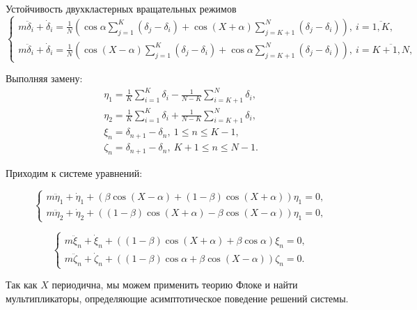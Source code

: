 \begin{chapter}{Устойчивость двухкластерных вращательных режимов}
	\begin{equation}
		\begin{cases}
			m\ddot{\delta}_i + \dot{\delta}_i = \frac{1}{N} \left( \cos{\alpha} \sum_{j = 1}^K (\delta_j - \delta_i) + \cos{(X + \alpha)} \sum_{j = K + 1}^N (\delta_j - \delta_i) \right), \ i = \overline{1,K}, \\
			m\ddot{\delta}_i + \dot{\delta}_i = \frac{1}{N} \left( \cos{(X - \alpha)} \sum_{j = 1}^K (\delta_j - \delta_i) +  \cos{\alpha} \sum_{j = K + 1}^N (\delta_j - \delta_i)  \right), \ i = \overline{K + 1,N},
		\end{cases}		
	\end{equation}
	
	Выполняя замену:
	\begin{align*}
		\eta_1 = \frac{1}{K} \sum_{i = 1}^K \delta_i - \frac{1}{N - K} \sum_{i = K + 1}^N \delta_i, \\
		\eta_2 = \frac{1}{K} \sum_{i = 1}^K \delta_i + \frac{1}{N - K} \sum_{i = K + 1}^N \delta_i, \\
		\xi_n = \delta_{n+1} - \delta_n, \ 1 \leq  n \leq K - 1, \\
		\zeta_n = \delta_{n+1} - \delta_n, \ K + 1 \leq n \leq N - 1.
	\end{align*}
		
	Приходим к системе уравнений:
	
	\begin{equation} \label{split-linear-pert-sys-n12}
		\begin{cases}
			m\ddot{\eta}_1 + \dot{\eta}_1 + \left( \beta \cos{(X - \alpha)} + (1 - \beta) \cos{(X + \alpha)} \right) \eta_1 = 0, \\
			m\ddot{\eta}_2 + \dot{\eta}_2 + \left( (1 - \beta) \cos{(X + \alpha)} - \beta \cos{(X - \alpha)} \right) \eta_1 = 0,
		\end{cases}
	\end{equation}
	
	
	\begin{equation} \label{split-linear-pert-sys-ksi-eta}
		\begin{cases}
			m\ddot{\xi}_n + \dot{\xi}_n + \left( (1 - \beta) \cos{(X + \alpha)} + \beta \cos{\alpha} \right) \xi_n = 0, \\
			m\ddot{\zeta}_n + \dot{\zeta}_n + \left( (1 - \beta) \cos{\alpha} + \beta \cos{(X - \alpha)} \right) \zeta_n = 0.
		\end{cases}
	\end{equation}
	
	Так как $X$ периодична, мы можем применить теорию Флоке
	и найти мультипликаторы, определяющие асимптотическое поведение решений системы.
	

\end{chapter}
